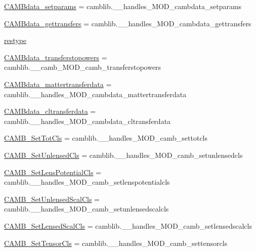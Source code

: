 \begin{DoxyCompactItemize}
\item 
\mbox{\hyperlink{namespacecamb_1_1camb_a8989230d759d722a2d755aa0d9402540}{C\+A\+M\+Bdata\+\_\+setparams}} = camblib.\+\_\+\+\_\+handles\+\_\+\+M\+O\+D\+\_\+cambdata\+\_\+setparams
\item 
\mbox{\hyperlink{namespacecamb_1_1camb_a2f678b52b4292fa87d1c3a234b60d70a}{C\+A\+M\+Bdata\+\_\+gettransfers}} = camblib.\+\_\+\+\_\+handles\+\_\+\+M\+O\+D\+\_\+cambdata\+\_\+gettransfers
\item 
\mbox{\hyperlink{namespacecamb_1_1camb_a007debd6eaa7dfaa6b646e1d52d44e23}{restype}}
\item 
\mbox{\hyperlink{namespacecamb_1_1camb_a7e017c1b578bba9b94140ca43426bb97}{C\+A\+M\+Bdata\+\_\+transferstopowers}} = camblib.\+\_\+\+\_\+camb\+\_\+\+M\+O\+D\+\_\+camb\+\_\+transferstopowers
\item 
\mbox{\hyperlink{namespacecamb_1_1camb_a22e1da190a23d558f4889e9086503080}{C\+A\+M\+Bdata\+\_\+mattertransferdata}} = camblib.\+\_\+\+\_\+handles\+\_\+\+M\+O\+D\+\_\+cambdata\+\_\+mattertransferdata
\item 
\mbox{\hyperlink{namespacecamb_1_1camb_aafbbcf3b194b67954e5dca258bfdc4f3}{C\+A\+M\+Bdata\+\_\+cltransferdata}} = camblib.\+\_\+\+\_\+handles\+\_\+\+M\+O\+D\+\_\+cambdata\+\_\+cltransferdata
\item 
\mbox{\hyperlink{namespacecamb_1_1camb_a73c96cbd1b5bd209e914b2761c6660ff}{C\+A\+M\+B\+\_\+\+Set\+Tot\+Cls}} = camblib.\+\_\+\+\_\+handles\+\_\+\+M\+O\+D\+\_\+camb\+\_\+settotcls
\item 
\mbox{\hyperlink{namespacecamb_1_1camb_a83f8a655acb58351b83ce3ab0a1f7323}{C\+A\+M\+B\+\_\+\+Set\+Unlensed\+Cls}} = camblib.\+\_\+\+\_\+handles\+\_\+\+M\+O\+D\+\_\+camb\+\_\+setunlensedcls
\item 
\mbox{\hyperlink{namespacecamb_1_1camb_a9d1d6551068d7ebe8094b48009909460}{C\+A\+M\+B\+\_\+\+Set\+Lens\+Potential\+Cls}} = camblib.\+\_\+\+\_\+handles\+\_\+\+M\+O\+D\+\_\+camb\+\_\+setlenspotentialcls
\item 
\mbox{\hyperlink{namespacecamb_1_1camb_a8f43a2cd701774298a2aae8a8a1555ec}{C\+A\+M\+B\+\_\+\+Set\+Unlensed\+Scal\+Cls}} = camblib.\+\_\+\+\_\+handles\+\_\+\+M\+O\+D\+\_\+camb\+\_\+setunlensedscalcls
\item 
\mbox{\hyperlink{namespacecamb_1_1camb_a7c8683b7064e1efa3ed6ccdda9f0e7c8}{C\+A\+M\+B\+\_\+\+Set\+Lensed\+Scal\+Cls}} = camblib.\+\_\+\+\_\+handles\+\_\+\+M\+O\+D\+\_\+camb\+\_\+setlensedscalcls
\item 
\mbox{\hyperlink{namespacecamb_1_1camb_a605dac3da7894bf4ae7c1d601cecb992}{C\+A\+M\+B\+\_\+\+Set\+Tensor\+Cls}} = camblib.\+\_\+\+\_\+handles\+\_\+\+M\+O\+D\+\_\+camb\+\_\+settensorcls

\end{DoxyCompactItemize}

